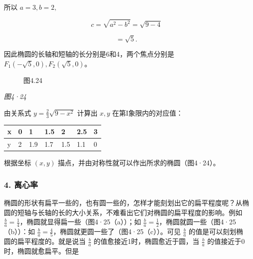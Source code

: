 所以 \(a = 3, b = 2,\)

\[
c = \sqrt {a^{2} - b^{2}} = \sqrt {9 - 4}
\]

\[
= \sqrt {5}.
\]

因此椭圆的长轴和短轴的长分别是6和4，两个焦点分别是
\(F_{1}(-\sqrt{5},0), F_{2}(\sqrt{5},0)\)。

\begin{figure}
\centering
{}
\caption{图4.24}
\end{figure}

\emph{图4·24}

由关系式 \(y = \frac{2}{3}\sqrt{9 - x^2}\) 计算出 \(x, y\)
在第I象限内的对应值：

{\def\LTcaptype{none} %
\begin{longtable}[]{@{}lllllll@{}}
\toprule\noalign{}
x & 0 & 1 & 1.5 & 2 & 2.5 & 3 \\
\midrule\noalign{}
\endhead
\bottomrule\noalign{}
\endlastfoot
y & 2 & 1.9 & 1.7 & 1.5 & 1.1 & 0 \\
\end{longtable}
}

根据坐标 \((x, y)\) 描点，并由对称性就可以作出所求的椭圆（图4·24）。

\subsubsection{4. 离心率}\label{ux79bbux5fc3ux7387}

椭圆的形状有扁平一些的，也有圆一些的，怎样才能刻划出它的扁平程度呢？从椭圆的短轴与长轴的长的大小关系，不难看出它们对椭圆的扁平程度的影响。例如
\(\frac{b}{a} = \frac{1}{4}\)，椭圆就显得扁一些（图4·25（a））；如
\(\frac{b}{a} = \frac{1}{2}\)，椭圆就圆一些（图4·25（b））：如
\(\frac{b}{a} = \frac{4}{5}\)，椭圆就更圆一些了（图4·25（c））。可见
\(\frac{b}{a}\) 的值是可以刻划椭圆的扁平程度的。就是说当 \(\frac{b}{a}\)
的值愈接近1时，椭圆愈近于圆，当 \(\frac{b}{a}\)
的值接近于0时，椭圆就愈扁平。但是

